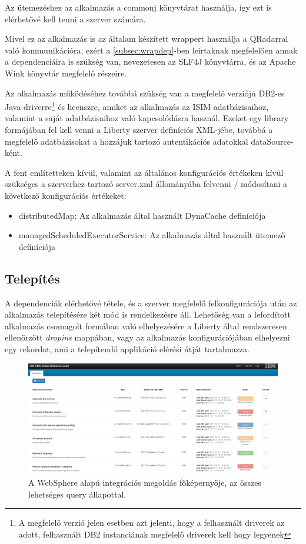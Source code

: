 Az ütemezéshez az alkalmazás a commonj \cite{commonj} könyvtárat használja, így ezt is elérhetővé kell tenni a szerver számára. 

Mivel ez az alkalmazás is az általam készített wrappert használja a QRadarral való kommunikációra, ezért a \ref{subsec:wrapdep}-ben leírtaknak megfelelően annak a dependenciáira is szükség van, nevezetesen az SLF4J könyvtárra, és az Apache Wink könyvtár megfelelő részeire.

Az alkalmazás működéséhez továbbá szükség van a megfelelő verziójú DB2-es Java driverre\footnote{A megfelelő verzió jelen esetben azt jelenti, hogy a felhasznált driverek az adott, felhasznált DB2 instanciának megfelelő driverek kell hogy legyenek} és licenszre, amiket az alkalmazás az ISIM adatbázisaihoz, valamint a saját adatbázisaihoz való kapcsolódásra használ. Ezeket egy library formájában fel kell venni a Liberty szerver definíciós XML-jébe, továbbá a megfelelő adatbázisokat a hozzájuk tartozó autentikációs adatokkal dataSource-ként.\cite{wsdatasource}

A fent említetteken kívül, valamint az általános konfigurációs értékeken kívül szükséges a szerverhez tartozó server.xml állományába felvenni / módosítani a következő konfigurációs értékeket:
\begin{itemize}
	\item distributedMap\cite{dynacache}: Az alkalmazás által használt DynaCache definíciója 
	\item managedScheduledExecutorService\cite{wsscheduler}: Az alkalmazás által használt ütemező definíciója
\end{itemize}

\subsection{Telepítés}
A dependenciák elérhetővé tétele, és a szerver megfelelő felkonfigurációja után az alkalmazás telepítésére két mód is rendelkezésre áll. Lehetőség van a lefordított alkalmazás csomagolt formában való elhelyezésére a Liberty által rendszeresen ellenőrzött \textit{dropins} mappában, vagy az alkalmazás konfigurációjában elhelyezni egy rekordot, ami a telepítendő applikáció elérési útját tartalmazza. \cite{wsdropin}

\begin{figure}[!h]
	\centering
	\includegraphics[width=0.8\linewidth]{figures/refloader_ui/all_states}
	\caption{A WebSphere alapú integrációs megoldás főképernyője, az összes lehetséges query állapottal.}
	\label{fig:allstates}
\end{figure}

